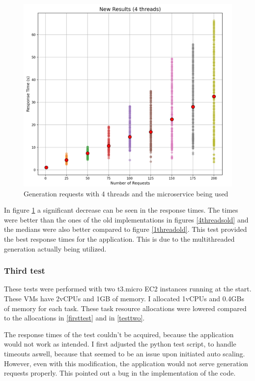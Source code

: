 			\begin{figure}[h]
				\begin{center}
					\includegraphics[scale=0.6]{include/imgs/4threads_new.PNG}
					\caption{Generation requests with 4 threads and the microservice being used}
					\label{4threadsnew}
				\end{center}
			\end{figure}

			In figure \ref{4threadsnew} a significant decrease can be seen in the response times. 
			The times were better than the ones of the old implementations in figures 
			\ref{4threadsold} and the medians were also better compared to figure \ref{1threadold}.
			This test provided the best response times for the application.
			This is due to the multithreaded generation actually being utilized.


		\subsubsection{Third test} \label{testthree}
			These tests were performed with two t3.micro EC2 instances running at the start. 
			These VMs have 2vCPUs and 1GB of memory. I allocated
			1vCPUs and 0.4GBs of memory for each task. 
			These task resource allocations were lowered compared to the allocations in \ref{firsttest} and in \ref{testtwo}.

			The response times of the test couldn't be acquired, because the application would not work as intended. 
			I first adjusted the python test script, to handle timeouts aswell, because that seemed to be an issue upon initiated 
			auto scaling. However, even with this modification, the application would not serve generation requests properly.
			This pointed out a bug in the implementation of the code.

